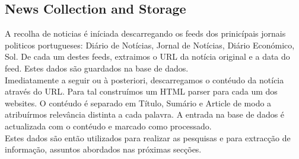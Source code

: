 \subsection{News Collection and Storage}
\label{sec:news_storage}
A recolha de noticias é iníciada descarregando os feeds dos prinicípais jornais politicos portugueses: Diário de Notícias, Jornal de Notícias, Diário Económico, Sol. De cada um destes feeds, extraimos o URL da notícia original e a data do feed. Estes dados são guardados na base de dados.\\
Imediatamente a seguir ou à posteriori, descarregamos o contéudo da notícia através do URL. Para tal construímos um HTML parser para cada um dos websites. O contéudo é separado em Título, Sumário e Article de modo a atribuírmos relevância distinta a cada palavra. A entrada na base de dados é actualizada com o contéudo e marcado como processado.\\
Estes dados são então utilizados para realizar as pesquisas e para extracção de informação, assuntos abordados nas próximas secções.